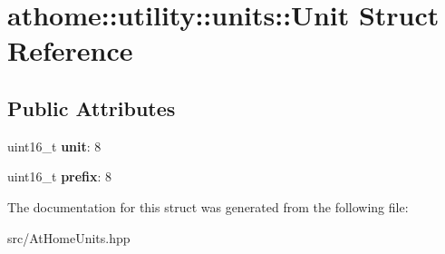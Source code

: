 \hypertarget{structathome_1_1utility_1_1units_1_1_unit}{}\section{athome\+:\+:utility\+:\+:units\+:\+:Unit Struct Reference}
\label{structathome_1_1utility_1_1units_1_1_unit}
\subsection*{Public Attributes}
\begin{DoxyCompactItemize}
\item 
\mbox{\label{structathome_1_1utility_1_1units_1_1_unit_a89105ac27210dd544d332cba97d687dd}} 
uint16\+\_\+t {\bfseries unit}\+: 8
\item 
\mbox{\label{structathome_1_1utility_1_1units_1_1_unit_a1aa6dbc26d3e4174883bf7641ec1933f}} 
uint16\+\_\+t {\bfseries prefix}\+: 8
\end{DoxyCompactItemize}


The documentation for this struct was generated from the following file\+:\begin{DoxyCompactItemize}
\item 
src/At\+Home\+Units.\+hpp\end{DoxyCompactItemize}
